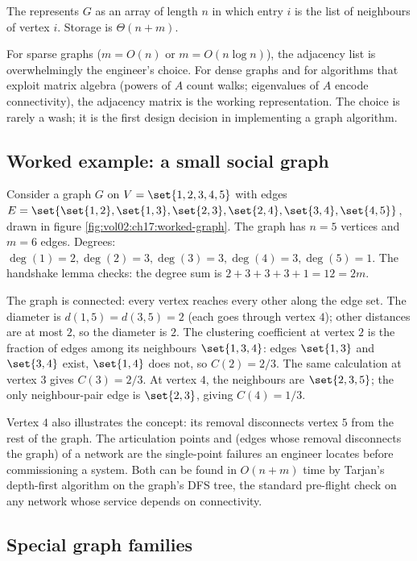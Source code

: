 The  represents $G$ as an array of length
$n$ in which entry $i$ is the list of neighbours of vertex $i$.
Storage is $\Theta(n + m)$.

For sparse graphs ($m = O(n)$ or $m = O(n \log n)$), the adjacency
list is overwhelmingly the engineer's choice. For dense graphs and
for algorithms that exploit matrix algebra (powers of $A$ count
walks; eigenvalues of $A$ encode connectivity), the adjacency
matrix is the working representation. The choice is rarely a wash;
it is the first design decision in implementing a graph algorithm.

\subsection{Worked example: a small social graph}

Consider a graph $G$ on $V = \set{1, 2, 3, 4, 5}$ with edges $E =
\set{\set{1,2}, \set{1,3}, \set{2,3}, \set{2,4}, \set{3,4},
\set{4,5}}$, drawn in figure
\ref{fig:vol02:ch17:worked-graph}. The graph has $n = 5$ vertices
and $m = 6$ edges. Degrees: $\deg(1) = 2, \deg(2) = 3, \deg(3) = 3,
\deg(4) = 3, \deg(5) = 1$. The handshake lemma checks: the degree
sum is $2 + 3 + 3 + 3 + 1 = 12 = 2 m$.



The graph is connected: every vertex reaches every other along the
edge set. The diameter is $d(1, 5) = d(3, 5) = 2$ (each goes through
vertex $4$); other distances are at most $2$, so the diameter is
$2$. The clustering coefficient at vertex $2$ is the fraction of
edges among its neighbours $\set{1, 3, 4}$: edges $\set{1,3}$ and
$\set{3,4}$ exist, $\set{1,4}$ does not, so $C(2) = 2/3$. The same
calculation at vertex $3$ gives $C(3) = 2/3$. At vertex $4$, the
neighbours are $\set{2, 3, 5}$; the only neighbour-pair edge is
$\set{2, 3}$, giving $C(4) = 1/3$.

Vertex $4$ also illustrates the 
concept: its removal disconnects vertex $5$ from the rest of the
graph. The articulation points and  (edges whose
removal disconnects the graph) of a network are the single-point
failures an engineer locates before commissioning a system. Both
can be found in $O(n + m)$ time by Tarjan's depth-first algorithm
on the graph's DFS tree, the standard pre-flight check on any
network whose service depends on connectivity.

\subsection{Special graph families}

